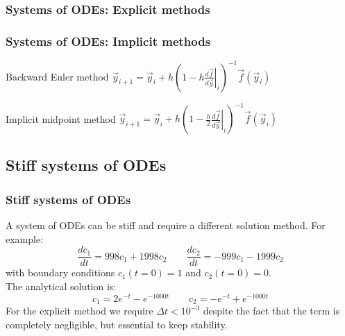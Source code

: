 \documentclass[11pt,table,final,fleqn,xcolor={usenames,dvipsnames,table}]{beamer}
\begin{document}
\begin{frame}
  \frametitle{Systems of ODEs: Explicit methods}
\end{frame}

\begin{frame}
  \frametitle{Systems of ODEs: Implicit methods}
  \begin{block}{Backward Euler method}
    $ \displaystyle  \vec{y}_{i+1} = \vec{y}_i + h \left(1 - h\left. \frac{d\vec{f}}{d\vec{y}}\right|_i \right)^{-1}\vec{f}(\vec{y}_i)$
  \end{block}
  \begin{block}{Implicit midpoint method}
    $ \displaystyle  \vec{y}_{i+1} = \vec{y}_i + h \left(1 - \frac{h}{2}\left. \frac{d\vec{f}}{d\vec{y}}\right|_i \right)^{-1} \vec{f}(\vec{y}_i)$
  \end{block}  
\end{frame}

\subsection{Stiff systems of ODEs}
\begin{frame}
  \frametitle{Stiff systems of ODEs}
  A system of ODEs can be stiff and require a different solution method. \pause
  For example:
  \[
    \frac{dc_1}{dt} = 998c_1 + 1998c_2 \qquad 
    \frac{dc_2}{dt} = -999c_1 -1999c_2
  \]
  with boundary conditions $c_1(t=0)=1$ and $c_2(t=0)=0$. \\
  The analytical solution is: 
  \[
    c_1 = 2e^{-t}-e^{-1000t} \qquad
    c_2 =-e^{-t}+e^{-1000t}
  \]
  For the explicit method we require $\Delta t<10^{-3}$ despite the fact that the term is completely negligible, but essential to keep stability. \pause
\end{frame}
\end{document}
